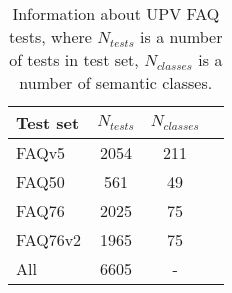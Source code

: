 \begin{table}[!ht] 
    \centering   
    \begin{tabular}{lccc}
        \toprule
        Test set & $N_{tests}$  & $N_{classes}$\\
        \midrule
        FAQv5     & 2054 & 211 \\
        FAQ50     & 561  & 49  \\
        FAQ76     & 2025 & 75  \\
        FAQ76v2   & 1965 & 75  \\
        \midrule
        All       & 6605 & -   \\
        \bottomrule
    \end{tabular}
    \caption{Information about UPV FAQ tests, where $N_{tests}$ is a number of tests in test set, $N_{classes}$ is a number of semantic classes.}
    \label{table:UPV_FAQ_info}
\end{table}